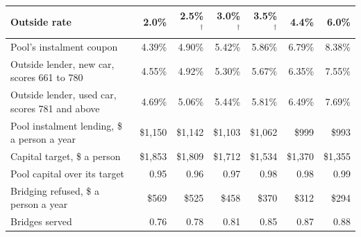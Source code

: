 \begin{tabular}{lrrrrrr}
\toprule
Outside rate & 2.0\% & 2.5\%$^{\dagger}$ & 3.0\%$^{\dagger}$ & 3.5\%$^{\dagger}$ & 4.4\% & 6.0\% \\
\midrule
Pool's instalment coupon & 4.39\% & 4.90\% & 5.42\% & 5.86\% & 6.79\% & 8.38\% \\
Outside lender, new car, scores 661 to 780 & 4.55\% & 4.92\% & 5.30\% & 5.67\% & 6.35\% & 7.55\% \\
Outside lender, used car, scores 781 and above & 4.69\% & 5.06\% & 5.44\% & 5.81\% & 6.49\% & 7.69\% \\
\midrule
Pool instalment lending, \$ a person a year & \$1{,}150 & \$1{,}142 & \$1{,}103 & \$1{,}062 & \$999 & \$993 \\
Capital target, \$ a person & \$1{,}853 & \$1{,}809 & \$1{,}712 & \$1{,}534 & \$1{,}370 & \$1{,}355 \\
Pool capital over its target & 0.95 & 0.96 & 0.97 & 0.98 & 0.98 & 0.99 \\
Bridging refused, \$ a person a year & \$569 & \$525 & \$458 & \$370 & \$312 & \$294 \\
Bridges served & 0.76 & 0.78 & 0.81 & 0.85 & 0.87 & 0.88 \\
\bottomrule
\end{tabular}
